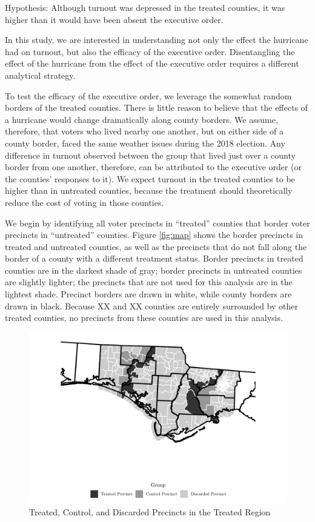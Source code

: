 \documentclass[
  12pt,
]{article}
\begin{document}
Hypothesis: Although turnout was depressed in the treated counties, it was higher than it would have been absent the executive order.

In this study, we are interested in understanding not only the effect the hurricane had on turnout, but also the efficacy of the executive order. Disentangling the effect of the hurricane from the effect of the executive order requires a different analytical strategy.

To test the efficacy of the executive order, we leverage the somewhat random borders of the treated counties. There is little reason to believe that the effects of a hurricane would change dramatically along county borders. We assume, therefore, that voters who lived nearby one another, but on either side of a county border, faced the same weather issues during the 2018 election. Any difference in turnout observed between the group that lived just over a county border from one another, therefore, can be attributed to the executive order (or the counties' responses to it). We expect turnout in the treated counties to be higher than in untreated counties, because the treatment should theoretically reduce the cost of voting in those counties.

We begin by identifying all voter precincts in ``treated'' counties that border voter precincts in ``untreated'' counties. Figure \ref{fig:map} shows the border precincts in treated and untreated counties, as well as the precincts that do not fall along the border of a county with a different treatment status. Border precincts in treated counties are in the darkest shade of gray; border precincts in untreated counties are slightly lighter; the precincts that are not used for this analysis are in the lightest shade. Precinct borders are drawn in white, while county borders are drawn in black. Because XX and XX counties are entirely surrounded by other treated counties, no precincts from these counties are used in this analysis.

\begin{figure}[H]

{\centering \includegraphics{hurricane_michael_files/figure-latex/map-chunk-1} 

}

\caption{\label{fig:map}Treated, Control, and Discarded Precincts in the Treated Region}\label{fig:map-chunk}
\end{figure}
\end{document}
